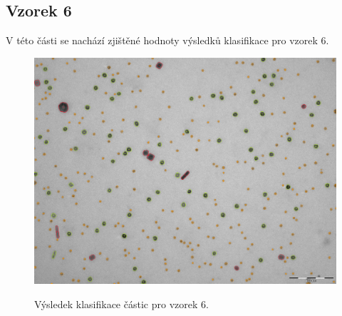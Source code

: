 \documentclass[11pt,twoside,a4paper,table]{book}
\begin{document}
\newpage
\FloatBarrier
\subsection{Vzorek 6}
V této části se nachází zjištěné hodnoty výsledků klasifikace pro vzorek 6.

\begin{figure}[h]
\center
\includegraphics[width=\textwidth]{figures/multi8_klasifikace.png}
\label{fig:class6}
\caption{Výsledek klasifikace částic pro vzorek 6.}
\end{figure}
\end{document}
